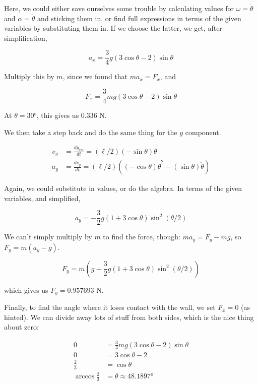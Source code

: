 \documentclass[8.01x]{subfiles}
\begin{document}
Here, we could either save ourselves some trouble by calculating values for $\omega = \dot{\theta}$ and $\alpha = \ddot{\theta}$ and sticking them in, or find full expressions in terms of the given variables by substituting them in. If we choose the latter, we get, after simplification,

\begin{equation}
a_x = \frac{3}{4} g (3 \cos \theta - 2) \sin \theta
\end{equation}

Multiply this by $m$, since we found that $m a_x = F_x$, and

\begin{equation}
F_x = \frac{3}{4} m g (3 \cos \theta - 2) \sin \theta
\end{equation}

At $\theta = \ang{30}$, this gives us 0.336 N.

We then take a step back and do the same thing for the $y$ component.

\begin{align}
v_y &= \frac{d y_{cm}}{dt} = (\ell/2) (-\sin \theta) \dot{\theta}\\
a_y &= \frac{d v_y}{dt}    = (\ell/2) ((-\cos \theta) \dot{\theta}^2 - (\sin \theta) \ddot{\theta})
\end{align}

Again, we could substitute in values, or do the algebra. In terms of the given variables, and simplified,

\begin{equation}
a_y = -\frac{3}{2} g(1 + 3\cos \theta) \sin^2(\theta/2)
\end{equation}

We can't simply multiply by $m$ to find the force, though: $m a_y = F_y - m g$, so $F_y = m (a_y - g)$.

\begin{equation}
F_y = m\left(g -\frac{3}{2} g(1 + 3\cos \theta) \sin^2(\theta/2)\right)
\end{equation}

which gives us $F_y = 0.957693$ N.

Finally, to find the angle where it loses contact with the wall, we set $F_x = 0$ (as hinted). We can divide away lots of stuff from both sides, which is the nice thing about zero:

\begin{align}
0 &= \frac{3}{4} m g (3 \cos \theta - 2) \sin \theta\\
0 &= 3 \cos \theta - 2\\
\frac{2}{3} &= \cos \theta\\
\arccos \frac{2}{3} &= \theta \approx \ang{48.1897}
\end{align}
\end{document}
